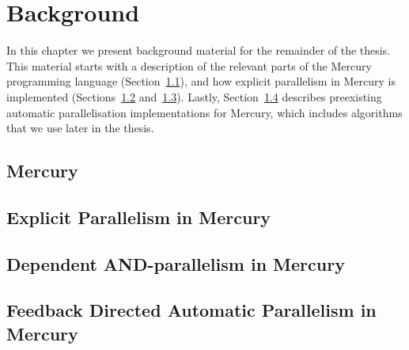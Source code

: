 
\chapter{Background}
\label{chap:backgnd}

In this chapter we present background material for the remainder of the
thesis.
This material starts with a description of the relevant parts of the Mercury
programming language (Section~\ref{sec:backgnd_mercury}),
and how explicit parallelism in Mercury is implemented
(Sections~\ref{sec:backgnd_merpar} and~\ref{sec:backgnd_deppar}).
Lastly, Section~\ref{sec:backgnd_autopar} describes preexisting automatic
parallelisation implementations for Mercury,
which includes algorithms that we use later in the thesis.

\section{Mercury}
\label{sec:backgnd_mercury}


\section{Explicit Parallelism in Mercury}
\label{sec:backgnd_merpar}


\section{Dependent AND-parallelism in Mercury}
\label{sec:backgnd_deppar}


\section{Feedback Directed Automatic Parallelism in Mercury}
\label{sec:backgnd_autopar}


